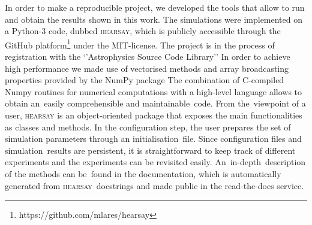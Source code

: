 \documentclass[crop]{CSLB}
\newcommand{\hs}{\textsc{hearsay}}
\begin{document}
%
In order to make a reproducible project, we developed the tools
that allow to run and obtain the results shown in this work.
%
The simulations were implemented on a Python-3 code, dubbed \hs{},
which is publicly accessible through the GitHub
platform\footnote{https://github.com/mlares/hearsay} under the
MIT-license.
%
The project is in the process of registration with the ‘’Astrophysics
Source Code Library’’ \citep[ASCL, ][]{2015JORS....3E..15A,
2020ASPC..522..731A}
%
In order to achieve high performance we made use of vectorised methods
and array broadcasting properties provided by the NumPy package
\citep{oliphant_numpy_2006, vanderwalt_numpy_2011}
%
The combination of C-compiled Numpy routines for numerical
computations with a high-level language allows to obtain an easily
comprehensible and maintainable code.
%
From the viewpoint of a user, \hs{} is an object-oriented package that
exposes the main functionalities as classes and methods.
%
In the configuration step, the user prepares the set of simulation
parameters through an initialisation file.
%
Since configuration files and simulation results are persistent, it is
straightforward to keep track of different experiments and the
experiments can be revisited easily.
%
An in-depth description of the methods can be found in the
documentation, which is automatically generated from \hs{} docstrings
and made public in the read-the-docs service.
\end{document}

